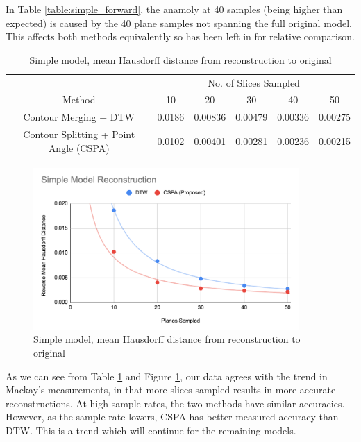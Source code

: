\documentclass[11p, titlepage]{article}
\begin{document}
In Table \ref{table:simple_forward}, the anamoly at 40 samples (being higher than expected) is caused by the 40 plane samples not spanning the full original model. This affects both methods equivalently so has been left in for relative comparison.

\begin{table}[h!]
\begin{tabular}{ | c | c | c | c | c | c | }
\hline
& \multicolumn{5}{c|}{No. of Slices Sampled} \\
\cline{2-6}
Method & 10 & 20 & 30 & 40 & 50 \\
\hline
Contour Merging + DTW & 0.0186 & 0.00836 & 0.00479 & 0.00336 & 0.00275 \\
Contour Splitting + Point Angle (CSPA) & 0.0102 & 0.00401 & 0.00281 & 0.00236 & 0.00215 \\
\hline
\end{tabular}
\caption{Simple model, mean Hausdorff distance from reconstruction to original}
\label{table:simple_reverse}
\end{table}

\begin{figure}[h!]
\centering
\includegraphics[width=0.9\textwidth]{graphs/simple-reverse}
\caption{Simple model, mean Hausdorff distance from reconstruction to original\label{fig:simple_reverse_graph}}
\end{figure}

As we can see from Table \ref{table:simple_reverse} and Figure \ref{fig:simple_reverse_graph}, our data agrees with the trend in Mackay's measurements, in that more slices sampled results in more accurate reconstructions. At high sample rates, the two methods have similar accuracies. However, as the sample rate lowers, CSPA has better measured accuracy than DTW. This is a trend which will continue for the remaining models.
\pagebreak
\end{document}
